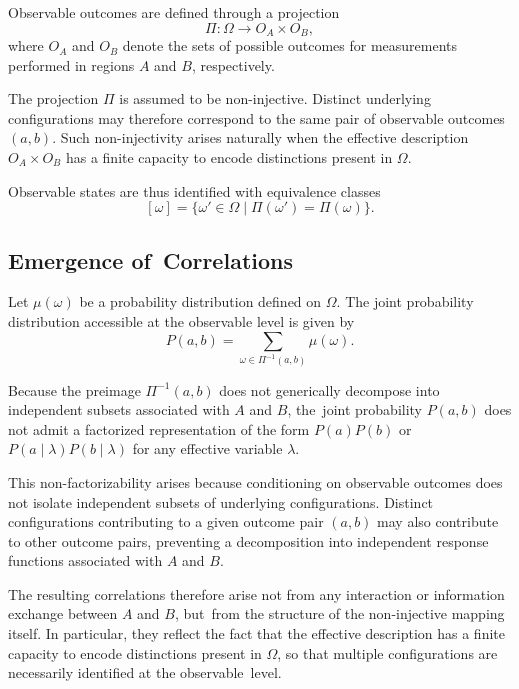 \documentclass[quantumrep,article,accept,pdftex,oneauthor]{Definitions/mdpi}
\theoremstyle{remark}
\begin{document}
    Observable outcomes are defined through a projection
    \[
      \Pi : \Omega \rightarrow O_A \times O_B ,
    \]
    where $O_A$ and $O_B$ denote the sets of possible outcomes for measurements performed
    in regions $A$ and $B$, respectively.

    The projection $\Pi$ is assumed to be non-injective.
    Distinct underlying configurations may therefore correspond to the same pair of
    observable outcomes $(a,b)$.
    Such non-injectivity arises naturally when the effective description $O_A \times O_B$
    has a finite capacity to encode distinctions present in $\Omega$.

    Observable states are thus identified with equivalence classes
    \[
      [\omega] = \{ \omega' \in \Omega \mid \Pi(\omega') = \Pi(\omega) \}.
    \]

  \subsection{Emergence of~Correlations}
    \label{subsec:emergence-of-correlations}

    Let $\mu(\omega)$ be a probability distribution defined on $\Omega$.
    The joint probability distribution accessible at the observable level is given by
    \[
      P(a,b) = \sum_{\omega \in \Pi^{-1}(a,b)} \mu(\omega).
    \]

    Because the preimage $\Pi^{-1}(a,b)$ does not generically decompose into independent
    subsets associated with $A$ and $B$, the~joint probability $P(a,b)$ does not admit a
    factorized representation of the form $P(a)P(b)$ or
    $P(a \mid \lambda) P(b \mid \lambda)$ for any effective variable $\lambda$.

    This non-factorizability arises because conditioning on observable outcomes does not
    isolate independent subsets of underlying configurations.
    Distinct configurations contributing to a given outcome pair $(a,b)$ may also
    contribute to other outcome pairs, preventing a decomposition into independent
    response functions associated with $A$ and $B$.

    The resulting correlations therefore arise not from any interaction or information
    exchange between $A$ and $B$, but~from the structure of the non-injective mapping
    itself.
    In particular, they reflect the fact that the effective description has a finite
    capacity to encode distinctions present in $\Omega$, so that multiple configurations
    are necessarily identified at the observable~level.
\end{document}
